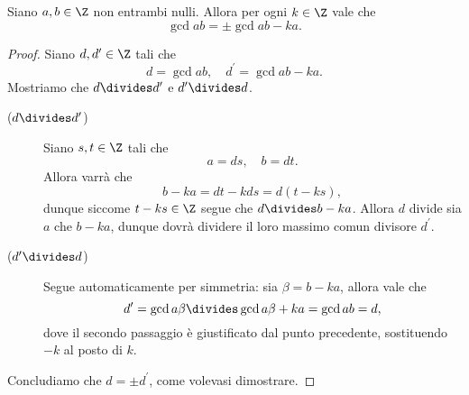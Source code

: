 \begin{lemma}\label{lem:mcd_diff}
    Siano $a, b \in \Z$ non entrambi nulli. Allora per ogni $k \in \Z$ vale che \begin{equation}
        \gcd{a}{b} = \pm\gcd{a}{b-ka}.    
    \end{equation}
\end{lemma}
\begin{proof}
    Siano $d, d^\prime \in \Z$ tali che \[
        d = \gcd{a}{b}, \quad d^\prime = \gcd{a}{b-ka}.    
    \] Mostriamo che $d \divides d^\prime$ e $d^\prime \divides d$.

    \begin{description}
        \item[($d \divides d^\prime$)] Siano $s, t \in \Z$ tali che \[
            a = ds, \quad b = dt.    
        \] Allora varrà che \[
            b - ka = dt - kds = d(t - ks),    
        \] dunque siccome $t - ks \in \Z$ segue che $d \divides b - ka$.
        Allora $d$ divide sia $a$ che $b - ka$, dunque dovrà dividere il loro massimo comun divisore $d^\prime$.
        \item[($d^\prime \divides d$)] Segue automaticamente per simmetria: sia $\beta = b - ka$, allora vale che \[
            d^\prime = \gcd{a}{\beta} \divides \gcd{a}{\beta + ka} = \gcd{a}{b} = d,  
        \] dove il secondo passaggio è giustificato dal punto precedente, sostituendo $-k$ al posto di $k$.
    \end{description}
    Concludiamo che $d = \pm d^\prime$, come volevasi dimostrare.
\end{proof}

